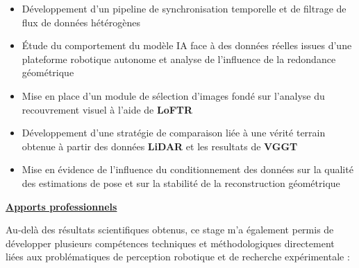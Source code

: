 \documentclass[12pt,a4paper,oneside]{report}
\begin{document}
\begin{itemize}[itemsep=0.2em, label=\textbullet, leftmargin=2cm]
    \item Développement d'un pipeline de synchronisation temporelle et de filtrage de flux de données hétérogènes 
    
    \item Étude du comportement du modèle IA face à des données réelles issues d'une plateforme robotique autonome et analyse de l'influence de la redondance géométrique 
    
    \item Mise en place d'un module de sélection d'images fondé sur l'analyse du recouvrement visuel à l'aide de \textbf{LoFTR} 
    
    \item Développement d'une stratégie de comparaison liée à une vérité terrain obtenue à partir des données \textbf{LiDAR} et les resultats de \textbf{VGGT}
    
    \item Mise en évidence de l'influence du conditionnement des données sur la qualité des estimations de pose et sur la stabilité de la reconstruction géométrique 

\end{itemize}

\newpage

\noindent\textbf{\uline{\large {Apports professionnels}}}\par
\medskip

\vspace{0.1cm}

\hspace*{1cm}Au-delà des résultats scientifiques obtenus, ce stage m'a également permis de développer plusieurs compétences techniques et méthodologiques directement liées aux problématiques de perception robotique et de recherche expérimentale :
\end{document}
